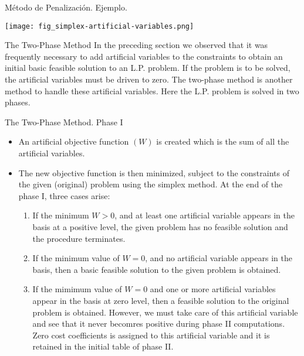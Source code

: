 \begin{frame}{Método de Penalización. Ejemplo.}{}
  {\centering
      \texttt{[image: fig\_simplex-artificial-variables.png]}
      \par}
\end{frame}

\begin{frame}{The Two-Phase Method}
  In the preceding  section we observed that it was frequently necessary to add artificial variables to the constraints to obtain an initial basic feasible solution to an L.P. problem. If the problem is to be solved, \alert{the artificial variables must be driven to zero}. The two-phase method is another method to handle these artificial variables. Here \alert{the L.P. problem is solved in two phases}.  
\end{frame}


\begin{frame}{The Two-Phase Method. Phase I}
  \begin{itemize} \justifying \parskip3mm
  \item<only@1> An artificial objective function $(W)$ is created which is \alert{the sum of all the artificial variables}.
  \item<only@1,2> \alert{The new objective function is then minimized}, subject to the \alert{constraints of the given (original) problem} using the simplex method. At the end of the phase I, three cases arise:
    \begin{enumerate} \justifying
    \item<only@2> If the \alert{minimum $W > 0$}, and at least one artificial variable appears in the basis at a positive level,  \alert{the given problem has no feasible solution} and the procedure terminates.
    \item<only@2> If the minimum value of \alert{$W = 0$, and no artificial variable appears in the basis}, then \alert{a basic feasible solution to the given problem is obtained}.
    \item<only@2> \alert{If the mimimum value of $W = 0$ and one or more artificial variables appear in the basis at zero level}, then a feasible solution to the original problem is obtained. However, \alert{we must take care of this artificial variable and see that it never becomres positive during phase II computations}. Zero cost coefficients is assigned to this artificial variable and it is retained in the initial table of phase II.
    \end{enumerate}
  \end{itemize}
\end{frame}



